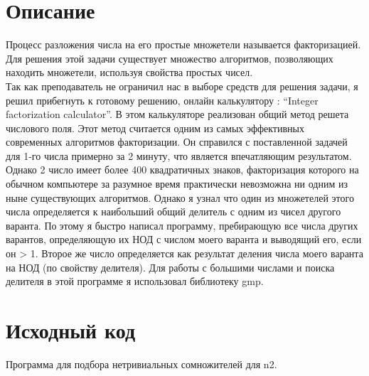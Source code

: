 \section{Описание}

Процесс разложения числа на его простые множетели называется факторизацией.
Для решения этой задачи существует множество алгоритмов, позволяющих находить множетели, используя свойства простых чисел.\\

Так как преподаватель не ограничил нас в выборе средств для решения задачи, я решил прибегнуть к готовому решению, онлайн калькулятору \cite{calc_page}: \enquote{Integer factorization calculator}. В этом калькуляторе реализован общий метод решета числового поля. Этот метод считается одним из самых эффективных современных алгоритмов факторизации. Он справился с поставленной
задачей для 1-го числа примерно за 2 минуту, что является впечатляющим результатом.\\
Однако 2 число имеет более 400 квадратичных знаков, факторизация которого на
обычном компьютере за разумное время практически невозможна ни одним из ныне
существующих алгоритмов. Однако я узнал что один из множетелей этого числа
определяется к наибольший общий делитель с одним из чисел другого варанта. Поэтому я быстро написал программу, пребирающую все числа других варантов, определяющую их НОД с числом моего варанта и выводящий его, если он > 1. Второе же число определяется как результат деления числа моего варанта на НОД (по свойству делителя). Для работы с большими числами и поиска делителя в этой программе я использовал библиотеку gmp.

\pagebreak

\section{Исходный код}

Программа для подбора нетривиальных сомножителей для n2.


